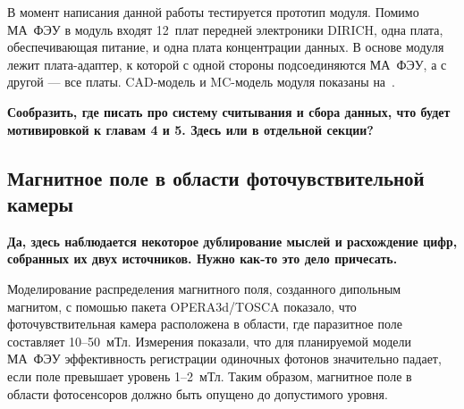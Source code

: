
В момент написания данной работы тестируется прототип модуля.
Помимо МА~ФЭУ в модуль входят 12~плат передней электроники DIRICH, одна плата, обеспечивающая питание, и одна плата концентрации данных. В основе модуля лежит плата-адаптер, к которой с одной стороны подсоединяются МА~ФЭУ, а с другой --- все платы. CAD-модель и MC-модель модуля показаны на~.

\todo \textbf{Сообразить, где писать про систему считывания и сбора данных, что будет мотивировкой к главам 4 и 5. Здесь или в отдельной секции?}


\subsection{Магнитное поле в области фоточувствительной камеры}\label{sec:CbmRichMagField}

\todo \textbf{Да, здесь наблюдается некоторое дублирование мыслей и расхождение цифр, собранных их двух источников. Нужно как-то это дело причесать.}

Моделирование распределения магнитного поля, созданного дипольным магнитом, с помошью пакета OPERA3d/TOSCA показало, что фоточувствительная камера расположена в области, где паразитное поле составляет 10--50~мТл. Измерения показали, что для планируемой модели МА~ФЭУ эффективность регистрации одиночных фотонов значительно падает, если поле превышает уровень 1--2~мТл. Таким образом, магнитное поле в области фотосенсоров должно быть опущено до допустимого уровня.

